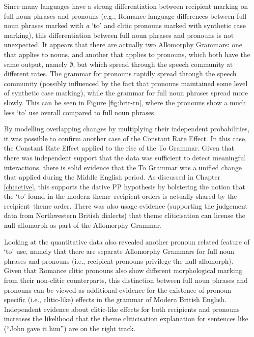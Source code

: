 	Since many languages have a strong differentiation between recipient marking on full noun phrases and pronouns (e.g., Romance language differences between full noun phrases marked with \textit{a} `to' and clitic pronouns marked with synthetic case marking), this differentiation between full noun phrases and pronouns is not unexpected. It appears that there are actually two Allomorphy Grammars: one that applies to nouns, and another that applies to pronouns, which both have the same output, namely $\emptyset$, but which spread through the speech community at different rates. The grammar for pronouns rapidly spread through the speech community (possibly influenced by the fact that pronouns maintained some level of synthetic case marking), while the grammar for full noun phrases spread more slowly. This can be seen in Figure \ref{fig:brit-tn}, where the pronouns show a much less `to' use overall compared to full noun phrases.

	By modelling overlapping changes by multiplying their independent probabilities, it was possible to confirm another case of the Constant Rate Effect. In this case, the Constant Rate Effect applied to the rise of the To Grammar. Given that there was independent support that the data was sufficient to detect meaningful interactions, there is solid evidence that the To Grammar was a unified change that applied during the Middle English period. As discussed in Chapter \ref{ch:active}, this supports the dative PP hypothesis by bolstering the notion that the `to' found in the modern theme--recipient orders is actually shared by the recipient--theme order. There was also usage evidence (supporting the judgement data from Northwestern British dialects) that theme cliticisation can license the null allomorph as part of the Allomorphy Grammar.
	
	Looking at the quantitative data also revealed another pronoun related feature of `to' use, namely that there are separate Allomorphy Grammars for full noun phrases and pronouns (i.e., recipient pronouns privilege the null allomorph). Given that Romance clitic pronouns also show different morphological marking from their non-clitic counterparts, this distinction between full noun phrases and pronouns can be viewed as additional evidence for the existence of pronoun specific (i.e., clitic-like) effects in the grammar of Modern British English. Independent evidence about clitic-like effects for both recipients and pronouns increases the likelihood that the theme cliticisation explanation for sentences like (``John gave it him'') are on the right track.

